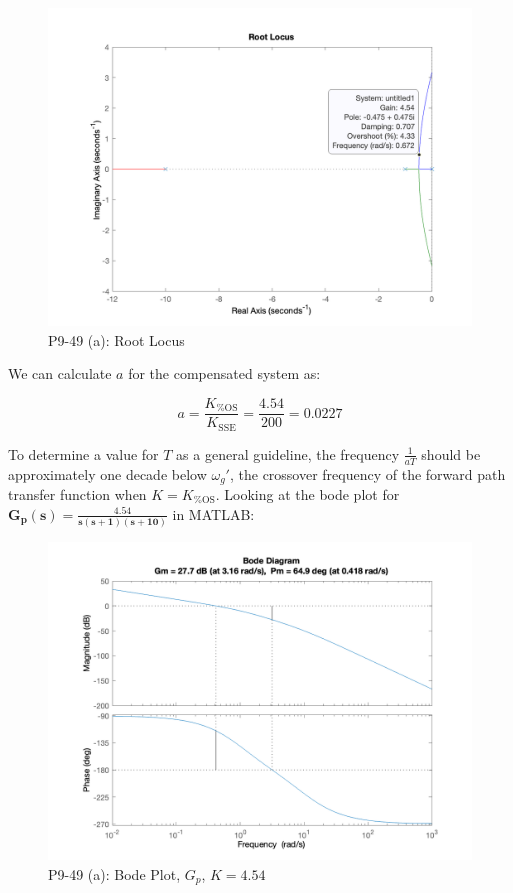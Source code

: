 \documentclass[12pt, letterpaper]{../assignment}
\begin{document}
\begin{figure}[H]
    \centering
    \includegraphics[width=1\linewidth]{./figures/rlocus_9_49a.png}
    \caption{P9-49 (a): Root Locus}
\end{figure}

We can calculate $a$ for the compensated system as:

$$ a = \frac{K_\text{\%OS}}{K_\text{SSE}} = \frac{4.54}{200} = 0.0227 $$

To determine a value for $T$ as a general guideline,
the frequency $\frac{1}{aT}$ should be approximately one decade below $\omega_g'$,
the crossover frequency of the forward path transfer function when $K = K_\text{\%OS}$.
Looking at the bode plot for $ \mathbf{ G_p(s) = \frac{4.54}{s(s +1)(s + 10)} } $ in MATLAB:

\begin{figure}[H]
    \centering
    \includegraphics[width=1\linewidth]{./figures/bode_prime_9_49a.png}
    \caption{P9-49 (a): Bode Plot, $G_p$, $K = 4.54$}
\end{figure}
\end{document}
